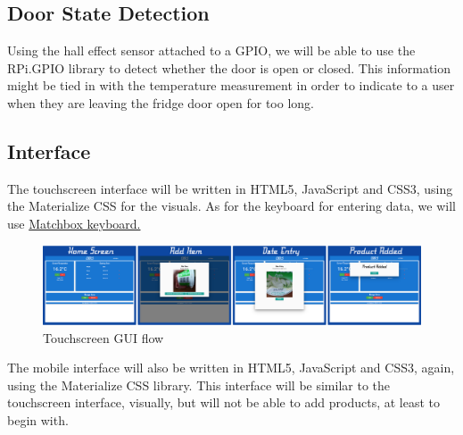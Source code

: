 \documentclass[10pt]{article}
\begin{document}
{{\subsection{Door State Detection}

Using the hall effect sensor attached to a GPIO, we will be able to use the RPi.GPIO library to detect whether the door is open or closed. This information might be tied in with the temperature measurement in order to indicate to a user when they are leaving the fridge door open for too long.
\newpage
\subsection{Interface}
The touchscreen interface will be written in HTML5, JavaScript and CSS3, using the Materialize CSS for the visuals. As for the keyboard for entering data, we will use \href{https://github.com/xlab/matchbox-keyboard}{Matchbox keyboard.}

\begin{figure}[h]
\centering
\caption{Touchscreen GUI flow}
\label{Touchscreen GUI flow}
\includegraphics[width=18cm]{images/GUI-flow.png}
\end{figure}



The mobile interface will also be written in HTML5, JavaScript and CSS3, again, using the Materialize CSS library. This interface will be similar to the touchscreen interface, visually, but will not be able to add products, at least to begin with.

}}
\end{document}
